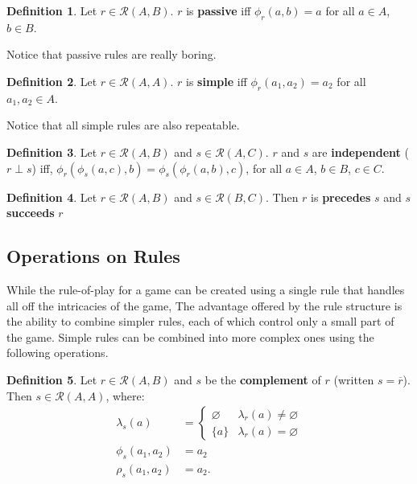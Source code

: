 \documentclass{article}
\theoremstyle{definition}
\newtheorem{definition}{Definition}[subsection]
\theoremstyle{plain}
\def\rule{\mathcal{R}}
\begin{document}
\begin{definition}
  Let $ r \in \rule (A, B) $. $ r $ is \textbf{passive} iff $ \phi_r (a, b) = a $ for all $ a \in A $, $ b \in B $.
\end{definition}

Notice that passive rules are really boring.

\begin{definition}
  Let $ r \in \rule (A, A) $. $ r $ is \textbf{simple} iff $ \phi_r (a_1, a_2) = a_2 $ for all $ a_1, a_2 \in A $.
\end{definition}

Notice that all simple rules are also repeatable.

\begin{definition}
  Let $ r \in \rule (A, B) $
  and $ s \in \rule (A, C) $.
  $r$ and $s$ are \textbf{independent} ($ r \perp s $) iff,
  $ \phi_r (\phi_s (a, c), b) = \phi_s (\phi_r (a, b), c) $, 
  for all $ a \in A $, $ b \in B $, $ c \in C $.
\end{definition}

\begin{definition}
  Let $ r \in \rule (A, B) $ and $ s \in \rule (B, C) $.
  Then $ r $ is \textbf{precedes} $ s $
  and $ s $ \textbf{succeeds} $ r $
\end{definition}

\subsection{Operations on Rules} %

While the rule-of-play for a game can be created using a single rule
that handles all off the intricacies of the game,
The advantage offered by the rule structure
is the ability to combine simpler rules,
each of which control only a small part of the game.
Simple rules can be combined into more complex ones using the following operations.

\begin{definition}
  Let $ r \in \rule (A, B) $
  and $ s $ be the \textbf{complement} of $ r $
  (written $ s = \overline{r} $).
  Then $ s \in \rule (A, A) $, where:
  \begin{align}
    \lambda_s (a)    & = \begin{cases}
                           \varnothing & \lambda_r (a) \neq \varnothing \\
                           \{ a \}     & \lambda_r (a) = \varnothing
                         \end{cases} \\
       \phi_s (a_1, a_2) & = a_2 \\
       \rho_s (a_1, a_2) & = a_2.
  \end{align}
\end{definition}
\end{document}
